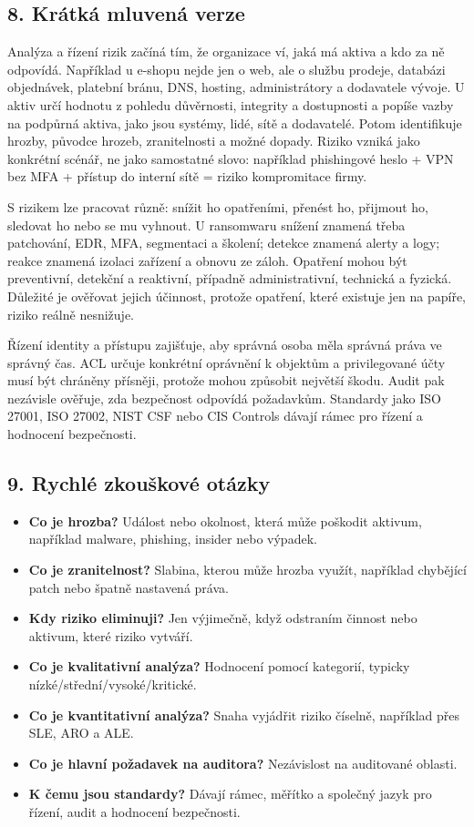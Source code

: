\subsection*{8. Krátká mluvená verze}

Analýza a řízení rizik začíná tím, že organizace ví, jaká má aktiva a kdo za ně odpovídá. Například u e-shopu nejde jen o web, ale o službu prodeje, databázi objednávek, platební bránu, DNS, hosting, administrátory a dodavatele vývoje. U aktiv určí hodnotu z pohledu důvěrnosti, integrity a dostupnosti a popíše vazby na podpůrná aktiva, jako jsou systémy, lidé, sítě a dodavatelé. Potom identifikuje hrozby, původce hrozeb, zranitelnosti a možné dopady. Riziko vzniká jako konkrétní scénář, ne jako samostatné slovo: například phishingové heslo + VPN bez MFA + přístup do interní sítě = riziko kompromitace firmy.

S rizikem lze pracovat různě: snížit ho opatřeními, přenést ho, přijmout ho, sledovat ho nebo se mu vyhnout. U ransomwaru snížení znamená třeba patchování, EDR, MFA, segmentaci a školení; detekce znamená alerty a logy; reakce znamená izolaci zařízení a obnovu ze záloh. Opatření mohou být preventivní, detekční a reaktivní, případně administrativní, technická a fyzická. Důležité je ověřovat jejich účinnost, protože opatření, které existuje jen na papíře, riziko reálně nesnižuje.

Řízení identity a přístupu zajišťuje, aby správná osoba měla správná práva ve správný čas. ACL určuje konkrétní oprávnění k objektům a privilegované účty musí být chráněny přísněji, protože mohou způsobit největší škodu. Audit pak nezávisle ověřuje, zda bezpečnost odpovídá požadavkům. Standardy jako ISO 27001, ISO 27002, NIST CSF nebo CIS Controls dávají rámec pro řízení a hodnocení bezpečnosti.

\subsection*{9. Rychlé zkouškové otázky}

\begin{itemize}
    \item \textbf{Co je hrozba?} Událost nebo okolnost, která může poškodit aktivum, například malware, phishing, insider nebo výpadek.
    \item \textbf{Co je zranitelnost?} Slabina, kterou může hrozba využít, například chybějící patch nebo špatně nastavená práva.
    \item \textbf{Kdy riziko eliminuji?} Jen výjimečně, když odstraním činnost nebo aktivum, které riziko vytváří.
    \item \textbf{Co je kvalitativní analýza?} Hodnocení pomocí kategorií, typicky nízké/střední/vysoké/kritické.
    \item \textbf{Co je kvantitativní analýza?} Snaha vyjádřit riziko číselně, například přes SLE, ARO a ALE.
    \item \textbf{Co je hlavní požadavek na auditora?} Nezávislost na auditované oblasti.
    \item \textbf{K čemu jsou standardy?} Dávají rámec, měřítko a společný jazyk pro řízení, audit a hodnocení bezpečnosti.
\end{itemize}

